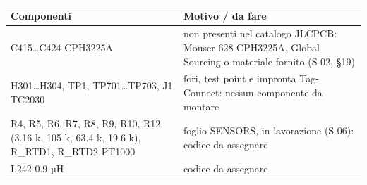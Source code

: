 {\small{}\setlength{\tabcolsep}{4pt}\renewcommand{\arraystretch}{1.1}
\begin{longtable}{>{\raggedright\arraybackslash}p{}>{\raggedright\arraybackslash}p{}}
\toprule
\textbf{Componenti} & \textbf{Motivo /\allowbreak{} da fare} \\
\midrule
\endhead
\bottomrule\endfoot
C415…C424 CPH3225A & non presenti nel catalogo JLCPCB: Mouser 628-CPH3225A, Global Sourcing o materiale fornito (S-02, §19) \\\midrule[0.15pt]
H301…H304, TP1, TP701…TP703, J1 TC2030 & fori, test point e impronta Tag-Connect: nessun componente da montare \\\midrule[0.15pt]
R4, R5, R6, R7, R8, R9, R10, R12 (3.16 k, 105 k, 63.4 k, 19.6 k), R\_\allowbreak{}RTD1, R\_\allowbreak{}RTD2 PT1000 & foglio SENSORS, in lavorazione (S-06): codice da assegnare \\\midrule[0.15pt]
L242 0.9 µH & codice da assegnare \\
\end{longtable}}
